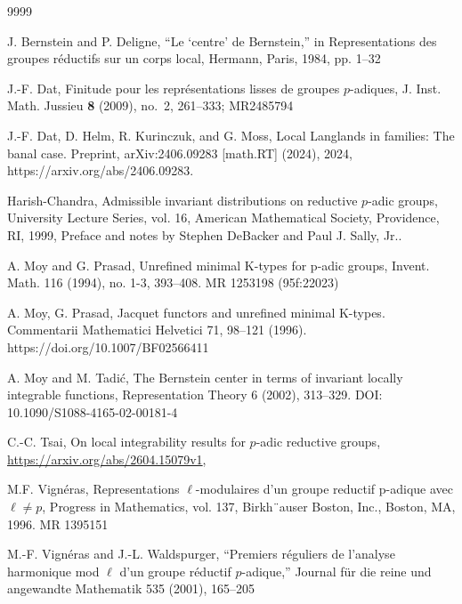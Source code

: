 \documentclass[12pt]{amsart}
\theoremstyle{definition}
\numberwithin{equation}{section}
\theoremstyle{remark}
\begin{document}
\begin{thebibliography}{9999}



J. Bernstein and P. Deligne, “Le ‘centre’ de Bernstein,” in Representations des groupes réductifs sur un corps local, Hermann, Paris, 1984, pp. 1–32




 J.-F. Dat, Finitude pour les repr\'esentations lisses de groupes $p$-adiques, J. Inst. Math. Jussieu {\bf 8} (2009), no.~2, 261--333; MR2485794

J.-F. Dat, D. Helm, R. Kurinczuk, and G. Moss, Local Langlands in families: The banal case. Preprint,
arXiv:2406.09283 [math.RT] (2024), 2024, https://arxiv.org/abs/2406.09283.

Harish-Chandra,
Admissible invariant distributions on reductive $p$-adic groups, University Lecture Series, vol. 16, American Mathematical Society, Providence, RI, 1999, Preface and notes by Stephen DeBacker and Paul J. Sally, Jr..

A. Moy and G. Prasad, Unrefined minimal K-types for p-adic groups, Invent. Math.
116 (1994), no. 1-3, 393–408. MR 1253198 (95f:22023)

A. Moy, G. Prasad,  Jacquet functors and unrefined minimal K-types. Commentarii Mathematici Helvetici 71, 98–121 (1996). https://doi.org/10.1007/BF02566411

A. Moy and M. Tadi\'{c},
 The Bernstein center in terms of invariant locally integrable functions,
Representation Theory 6 (2002), 313–329.
DOI: 10.1090/S1088-4165-02-00181-4





 C.-C. Tsai, On local integrability results for $p$-adic reductive groups, \url{https://arxiv.org/abs/2604.15079v1},


M.F. Vign\'{e}ras, Representations $\ell$-modulaires d’un groupe reductif p-adique avec
$\ell\neq p$, Progress in Mathematics, vol. 137, Birkh¨auser Boston, Inc., Boston, MA, 1996.
MR 1395151

M.-F. Vign\'{e}ras and J.-L. Waldspurger, “Premiers réguliers de l’analyse harmonique mod $\ell$ d’un groupe réductif $p$-adique,” Journal für die reine und angewandte Mathematik 535 (2001), 165–205



\end{thebibliography}
\end{document}
